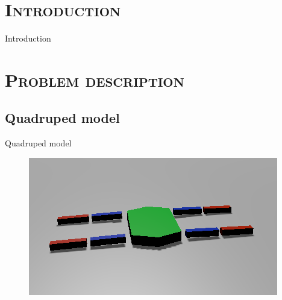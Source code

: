 \documentclass[xcolor=x11names,compress]{beamer}
\renewcommand{\(}{\begin{columns}}
\renewcommand{\)}{\end{columns}}
\newcommand{\<}[1]{\begin{column}{#1}}
\renewcommand{\>}{\end{column}}
\begin{document}
\section{\scshape Introduction}

\begin{frame}{Introduction}
\tableofcontents
\end{frame}

\section{\scshape Problem description}
\subsection{Quadruped model}
\begin{frame}{Quadruped model}

\begin{figure} \includegraphics[width=\textwidth]{quadruped.png}  \end{figure}

\end{frame}
\end{document}
